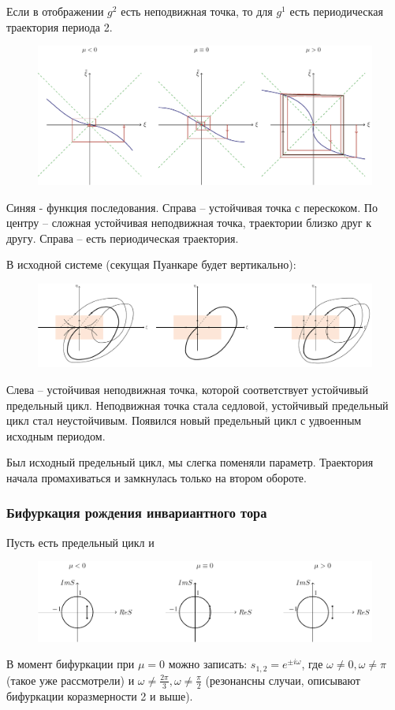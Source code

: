 Если в отображении $g^2$ есть неподвижная точка, то для $g^1$ есть периодическая траектория периода 2.
\begin{figure}[H]
	\centering
	\includegraphics[width=1\linewidth]{fig/fig69.pdf}   
\end{figure}
Синяя - функция последования. Справа -- устойчивая точка с перескоком. По центру -- сложная устойчивая неподвижная точка, траектории близко друг к другу. Справа -- есть периодическая траектория.

В исходной системе (секущая Пуанкаре будет вертикально):
\begin{figure}[H]
	\centering
	\includegraphics[width=1\linewidth]{fig/fig70.pdf}   
\end{figure}
Слева -- устойчивая неподвижная точка, которой соответствует устойчивый предельный цикл. Неподвижная точка стала седловой, устойчивый предельный цикл стал неустойчивым. Появился новый предельный цикл с удвоенным исходным периодом. 

Был исходный предельный цикл, мы слегка поменяли параметр. Траектория начала промахиваться и замкнулась только на втором обороте. 

\subsubsection{Бифуркация рождения инвариантного тора}
Пусть есть предельный цикл и
\begin{figure}[H]
	\centering
	\includegraphics[width=1\linewidth]{fig/fig71.pdf}   
\end{figure}
В момент бифуркации при $\mu=0$ можно записать: $s_{1,2}=e^{\pm i\omega}$, где $\omega \neq 0,\omega \neq \pi$ (такое уже рассмотрели) и $\omega \neq \frac{2\pi}{3},\omega \neq \frac{\pi}{2}$ (резонансны случаи, описывают бифуркации коразмерности 2 и выше).

